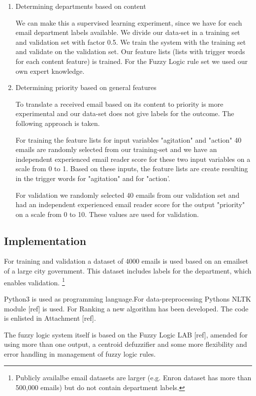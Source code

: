 \documentclass[journal]{IEEEtran}
\begin{document}
\begin{enumerate}
    \item{Determining departments based on content}

    We can make this a supervised learning experiment, since we have for each email department labels available. We divide our data-set in a training set and validation set with factor 0.5. We train the system with the training set and validate on the validation set. Our feature lists (lists with trigger words for each content feature) is trained. For the Fuzzy Logic rule set we used our own expert knowledge.

    \item{Determining priority based on general features}

    To translate a received email based on its content to priority is more experimental and our data-set does not give labels for the outcome. The following approach is taken. 

    For training the feature lists for input variables "agitation" and "action" 40 emails are randomly selected from our training-set and we have an independent experienced email reader score for these two input variables on a scale from 0 to 1. Based on these inputs, the feature lists are create resulting in the trigger words for "agitation" and for "action'. 

    For validation we randomly selected 40 emails from our validation set and had an independent experienced email reader score for the output "priority" on a scale from 0 to 10. These values are used for validation.

\end{enumerate}

\subsection{Implementation}

For training and validation a dataset of 4000 emails is used based on an emailset of a large city government. This dataset includes labels for the department, which enables validation. \footnote{Publicly availalbe email datasets are larger (e.g. Enron dataset has more than 500,000 emails) but do not contain department labels.}

Python3 is used as programming language.For data-preprocessing Pythons NLTK module [ref] is used. For Ranking a new algorithm has been developed. The code is enlisted in Attachment [ref].

The fuzzy logic system itself is based on the Fuzzy Logic LAB [ref], amended for using more than one output, a centroid defuzzifier and some more flexibility and error handling in management of fuzzy logic rules. 
\end{document}
